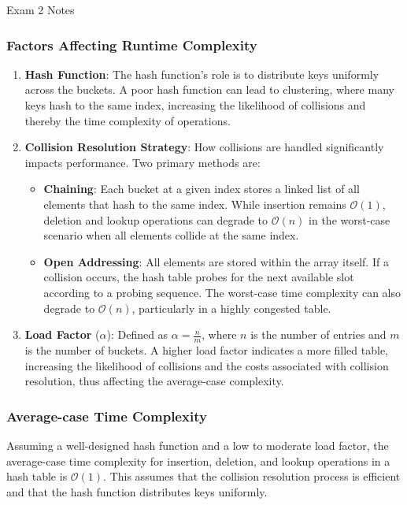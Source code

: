 \begin{examnotes}{Exam 2 Notes}
    \subsubsection*{Factors Affecting Runtime Complexity}
    
    \begin{enumerate}
        \item \textbf{Hash Function}: The hash function's role is to distribute keys uniformly across the buckets. A poor hash function can lead to clustering, where many keys hash to the same index, 
        increasing the likelihood of collisions and thereby the time complexity of operations.
        \item \textbf{Collision Resolution Strategy}: How collisions are handled significantly impacts performance. Two primary methods are:
        \begin{itemize}
            \item \textbf{Chaining}: Each bucket at a given index stores a linked list of all elements that hash to the same index. While insertion remains $\mathcal{O}(1)$, deletion and lookup operations 
            can degrade to $\mathcal{O}(n)$ in the worst-case scenario when all elements collide at the same index.
            \item \textbf{Open Addressing}: All elements are stored within the array itself. If a collision occurs, the hash table probes for the next available slot according to a probing sequence. 
            The worst-case time complexity can also degrade to $\mathcal{O}(n)$, particularly in a highly congested table.
        \end{itemize}
        \item \textbf{Load Factor} ($\alpha$): Defined as $\alpha = \frac{n}{m}$, where $n$ is the number of entries and $m$ is the number of buckets. A higher load factor indicates a more filled table, 
        increasing the likelihood of collisions and the costs associated with collision resolution, thus affecting the average-case complexity.
    \end{enumerate}
    
    \subsubsection*{Average-case Time Complexity}
    
    Assuming a well-designed hash function and a low to moderate load factor, the average-case time complexity for insertion, deletion, and lookup operations in a hash table is $\mathcal{O}(1)$. This 
    assumes that the collision resolution process is efficient and that the hash function distributes keys uniformly.
    

\end{examnotes}

